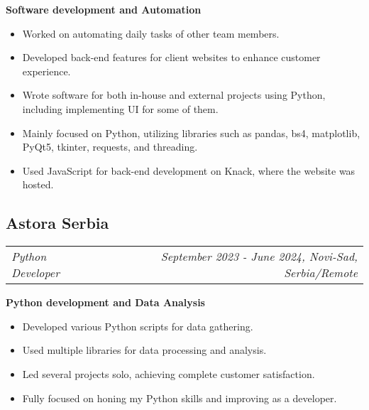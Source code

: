 \documentclass[11pt,a4paper]{moderncv}
\newcommand*{\experienceentry}[5][1.5mm]{
    \subsection{#2} \vspace{-1.5mm}
    \begin{tabularx}{\textwidth}{LR}
        {\itshape #3} & {\itshape #4, #5}
    \end{tabularx}
    \par\addvspace{#1}
}
\begin{document}
\begin{minipage}[t]{0.62\textwidth}
    \textbf{Software development and Automation}
    \begin{itemize}
        \item Worked on automating daily tasks of other team members.
        \item Developed back-end features for client websites to enhance customer experience.
        \item Wrote software for both in-house and external projects using Python, including implementing UI for some of them.
        \item Mainly focused on Python, utilizing libraries such as pandas, bs4, matplotlib, PyQt5, tkinter, requests, and threading.
        \item Used JavaScript for back-end development on Knack, where the website was hosted.
    \end{itemize}
    \vspace{1.0mm}

    \experienceentry{Astora Serbia}{Python Developer}{September 2023 - June 2024}{Novi-Sad, Serbia/Remote}

    \textbf{Python development and Data Analysis}
    \begin{itemize}
        \item Developed various Python scripts for data gathering.
        \item Used multiple libraries for data processing and analysis.
        \item Led several projects solo, achieving complete customer satisfaction.
        \item Fully focused on honing my Python skills and improving as a developer.
    \end{itemize}
    \vspace{2.0mm}

\end{minipage}
\hfill
\end{document}
